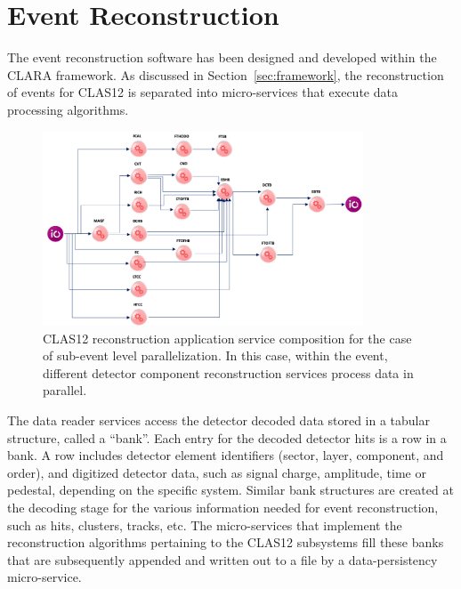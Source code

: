 \section{Event Reconstruction}
\label{sec:recon}

The event reconstruction software has been designed and developed within the CLARA framework. As discussed
in Section~\ref{sec:framework}, the reconstruction of events for CLAS12 is separated into micro-services that
execute data processing algorithms.

\begin{figure}
\centering
\includegraphics[width=0.85\textwidth]{pics/ServiceComposition.png}
\caption{CLAS12 reconstruction application service composition for the case of sub-event level parallelization.
In this case, within the event, different detector component reconstruction services process data in parallel.}
\label{fig:services}
\end{figure}

The data reader services access the detector decoded data stored in a tabular structure, called a ``bank''.
Each entry for the decoded detector hits is a row in a bank. A row includes detector element identifiers (sector,
layer, component, and order), and digitized detector data, such as signal charge, amplitude, time or pedestal,
depending on the specific system. Similar bank structures are created at the decoding stage for the various
information needed for event reconstruction, such as hits, clusters, tracks, etc. The micro-services that
implement the reconstruction algorithms pertaining to the CLAS12 subsystems fill these banks that are
subsequently appended and written out to a file by a data-persistency micro-service.

